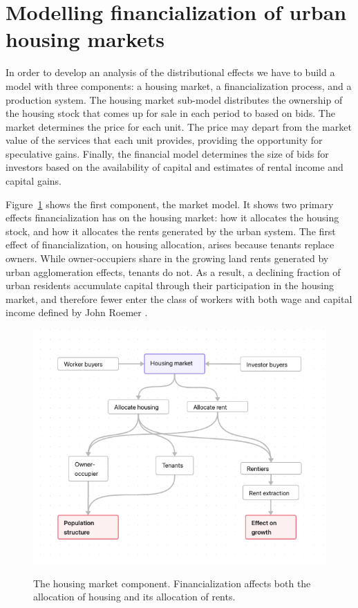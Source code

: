 \section{Modelling financialization of urban housing markets}
In order to develop an analysis of the distributional effects we have to build a model with three components: a housing market, a financialization process, and a production system. The housing market sub-model  distributes the ownership of the housing stock that comes up for sale in each period to based on bids. %
The market determines the price for each unit. The price may depart from the market value of the services that each unit provides, providing the opportunity for speculative gains. Finally, the financial model determines the size of bids for investors based on the availability of capital and estimates of rental income and capital gains.

Figure~\ref{fig-impacts} shows the first component, the market model.
It shows two primary effects financialization has on the housing market: how it allocates
the housing stock, and how it allocates the \glspl{rent} generated by the urban system. 
The first effect of financialization, on housing allocation, arises because tenants replace owners. While owner-occupiers share in the growing land rents generated by urban agglomeration effects, tenants do not. As a result, a declining fraction of urban residents accumulate capital through their participation in the housing market, and therefore fewer enter the class of workers with both wage and capital income defined by John Roemer \cite{roemerGeneralTheoryExploitation1982}. 

\begin{figure}[!ht]
\centering
\includegraphics[scale=.60]{fig/flow_impacts.png}
\label{fig-impacts}
\caption[The housing market component of the model.]{The housing market component. Financialization affects both the allocation of housing and its allocation of rents.}
\end{figure}


